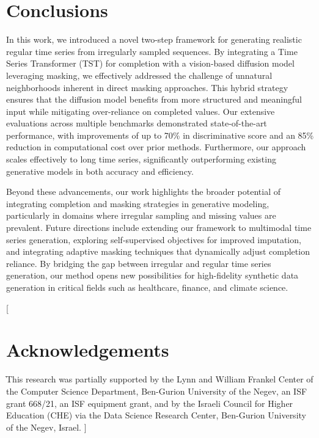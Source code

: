 \documentclass{article}
\theoremstyle{plain}
\theoremstyle{definition}
\theoremstyle{remark}
\newcommand {\idan}[1]{{\color{red}[#1]}}
\begin{document}
{\vspace{-3mm}
\section{Conclusions}
\vspace{-2mm}



In this work, we introduced a novel two-step framework for generating realistic regular time series from irregularly sampled sequences. By integrating a Time Series Transformer (TST) for completion with a vision-based diffusion model leveraging masking, we effectively addressed the challenge of unnatural neighborhoods inherent in direct masking approaches. This hybrid strategy ensures that the diffusion model benefits from more structured and meaningful input while mitigating over-reliance on completed values. Our extensive evaluations across multiple benchmarks demonstrated state-of-the-art performance, with improvements of up to 70\% in discriminative score and an 85\% reduction in computational cost over prior methods. Furthermore, our approach scales effectively to long time series, significantly outperforming existing generative models in both accuracy and efficiency.

Beyond these advancements, our work highlights the broader potential of integrating completion and masking strategies in generative modeling, particularly in domains where irregular sampling and missing values are prevalent. Future directions include extending our framework to multimodal time series generation, exploring self-supervised objectives for improved imputation, and integrating adaptive masking techniques that dynamically adjust completion reliance. By bridging the gap between irregular and regular time series generation, our method opens new possibilities for high-fidelity synthetic data generation in critical fields such as healthcare, finance, and climate science.

\idan{
\section*{Acknowledgements}
ֿThis research was partially supported by the Lynn and
William Frankel Center of the Computer Science Department, Ben-Gurion University of the Negev, an ISF grant
668/21, an ISF equipment grant, and by the Israeli Council
for Higher Education (CHE) via the Data Science Research
Center, Ben-Gurion University of the Negev, Israel.
}





}
\end{document}
